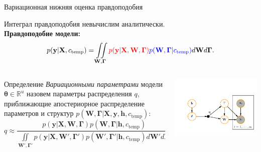 \documentclass[usenames,dvipsnames,11pt,pdf,utf8,russian,aspectratio=43]{beamer}
\begin{document}
\begin{frame}{Вариационная нижняя оценка правдоподобия} 
\footnotesize

Интеграл правдоподобия невычислим аналитически.\\
\textbf{Правдоподобие модели:}
\[
p(\mathbf{y}|\mathbf{X}, c_\text{temp}) =
 \iint\limits_{\mathbf{W}, \boldsymbol{\Gamma}}  \textcolor{red}{p(\mathbf{y}|\mathbf{X},\mathbf{W},  \boldsymbol{\Gamma})} \textcolor{blue}{p(\mathbf{W}, \boldsymbol{\Gamma}| c_\text{temp})}d\mathbf{W}d{\boldsymbol{\Gamma}}.                         
\]

\begin{columns}
\begin{column}{0.55\textwidth}
  
\begin{block}{Определение}
\textit{Вариационными параметрами} модели $\boldsymbol{\theta} \in \mathbb{R}^{{u}}$ назовем параметры распределения $q$, приближающие апостериорное распределение параметров и структур $p(\mathbf{W}, \boldsymbol{\Gamma}|\mathbf{X}, \mathbf{y}, \mathbf{h}, c_\text{temp})$:
\[
    q \approx  \frac{p(\mathbf{y}|\mathbf{X},\mathbf{W},\boldsymbol{\Gamma})p(\mathbf{W}, \boldsymbol{\Gamma}|\mathbf{h}, c_\text{temp})}{\iint\limits_{\mathbf{W}', \boldsymbol{\Gamma'}}p(\mathbf{y}|\mathbf{X},\mathbf{W}',\boldsymbol{\Gamma}')p(\mathbf{W}', \boldsymbol{\Gamma}'|\mathbf{h}, c_\text{temp})d\mathbf{W}'d\boldsymbol{\Gamma}'}.
\]
\end{block} 

\end{column}
\begin{column}{0.45\textwidth}  %
    \begin{center}
     \includegraphics[width=\textwidth]{plate.pdf}
     \end{center}
\end{column}
\end{columns}




\end{frame}
\end{document}

